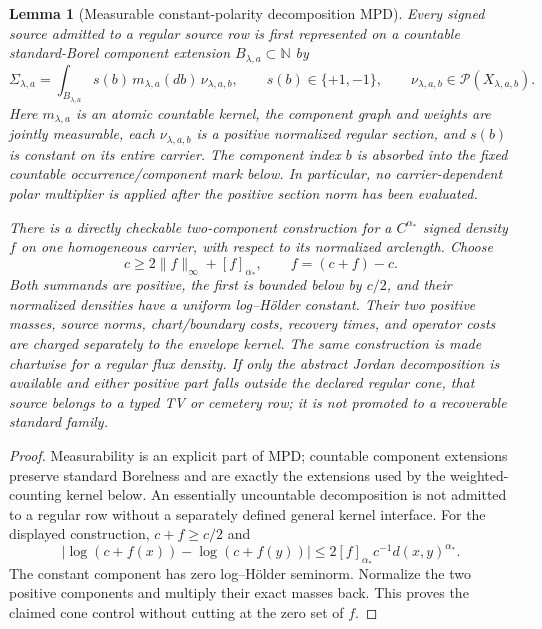 \documentclass[11pt]{article}
\newtheorem{lemma}[theorem]{Lemma}
\begin{document}
\begin{lemma}[Measurable constant-polarity decomposition
$\mathrm{MPD}$]
\label{lem:measurable-positive-decomposition}
Every signed source admitted to a regular source row is first represented on
a countable standard-Borel component extension
$B_{\lambda,a}\subset\mathbb N$ by
\begin{equation}
\label{eq:measurable-positive-decomposition}
 \Sigma_{\lambda,a}
 =\int_{B_{\lambda,a}}s(b)\,m_{\lambda,a}(db)\,
       \nu_{\lambda,a,b},
 \qquad s(b)\in\{+1,-1\},\qquad
 \nu_{\lambda,a,b}\in\mathcal P(X_{\lambda,a,b}).
\end{equation}
Here $m_{\lambda,a}$ is an atomic countable kernel, the component graph and
weights are jointly measurable, each
$\nu_{\lambda,a,b}$ is a positive normalized regular section, and $s(b)$ is
constant on its entire carrier.  The component index $b$ is absorbed into
the fixed countable occurrence/component mark below.  In particular, no
carrier-dependent polar multiplier is applied after the positive section
norm has been evaluated.

There is a directly checkable two-component construction for a
$C^{\alpha_*}$ signed density $f$ on one homogeneous carrier, with respect
to its normalized arclength.  Choose
\begin{equation}
\label{eq:baseline-cone-split}
 c\ge 2\|f\|_\infty+[f]_{\alpha_*},
 \qquad f=(c+f)-c.
\end{equation}
Both summands are positive, the first is bounded below by $c/2$, and their
normalized densities have a uniform log--H\"older constant.  Their two
positive masses, source norms, chart/boundary costs, recovery times, and
operator costs are charged separately to the envelope kernel.  The same
construction is made chartwise for a regular flux density.  If only the
abstract Jordan decomposition is available and either positive part falls
outside the declared regular cone, that source belongs to a typed TV or
cemetery row; it is not promoted to a recoverable standard family.
\end{lemma}

\begin{proof}
Measurability is an explicit part of $\mathrm{MPD}$; countable component
extensions preserve standard Borelness and are exactly the extensions used
by the weighted-counting kernel below.  An essentially uncountable
decomposition is not admitted to a regular row without a separately defined
general kernel interface.  For the displayed construction,
$c+f\ge c/2$ and
\[
 |\log(c+f(x))-\log(c+f(y))|
 \le 2[f]_{\alpha_*}c^{-1}d(x,y)^{\alpha_*}.
\]
The constant component has zero log--H\"older seminorm.  Normalize the two
positive components and multiply their exact masses back.  This proves the
claimed cone control without cutting at the zero set of $f$.
\end{proof}
\end{document}
